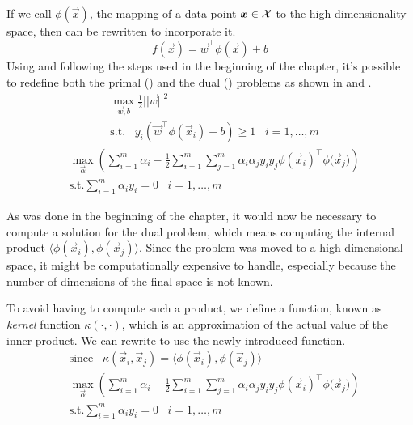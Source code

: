 If we call $\phi(\vec{x})$, the mapping of a data-point $\boldsymbol{x} \in \mathcal{X}$ to the high
dimensionality space, then  can be rewritten to incorporate it.
\begin{equation}
	\label{ep:hd-hyperplane}
	f(\vec{x}) = \vec{w}^\top \phi(\vec{x}) + b
\end{equation}
Using  and following the steps used in the beginning of the chapter,
it's possible to redefine both the primal () and the dual () problems
as shown in  and .
\begin{equation}
	\label{eq:hd-primal}
	\begin{aligned}
		 & \max_{\vec{w}, b}\frac{1}{2}||\vec{w}||^2                                                   \\
		 & \text{s.t.}\hspace{10pt}y_i(\vec{w}^\top\phi(\vec{x}_i) + b) \geq 1 \hspace{10pt}i = 1, \ldots, m
	\end{aligned}
\end{equation}
\begin{equation}
	\label{eq:hd-dual}
	\begin{aligned}
		 & \max_{\vec{\alpha}}\left(\sum_{i = 1}^{m}{\alpha_i} - \frac{1}{2}\sum_{i =
		1}^{m}\sum_{j = 1}^{m}{\alpha_i\alpha_j y_i y_j \phi(\vec{x}_i)^\top\phi(\vec{x}_j})\right)       \\
		 & \text{s.t.} \sum_{i = 1}^{m}{\alpha_i y_i} = 0 \hspace{10pt} i = 1, \ldots, m
	\end{aligned}
\end{equation}

As was done in the beginning of the chapter, it would now be necessary to compute a solution for the
dual problem, which means computing the internal product $\langle\phi(\vec{x}_i),
\phi(\vec{x}_j)\rangle$. Since the problem was moved to a high dimensional space, it might be
computationally expensive to handle, especially because the number of dimensions of the final space
is not known.

To avoid having to compute such a product, we define a function, known as \emph{kernel} function
$\kappa(\cdot, \cdot)$,
which is an approximation of the actual value of the inner product. We can rewrite  to use the newly introduced function.
\begin{equation}
	\label{eq:hd-dual-kf}
	\begin{aligned}
		&\text{since} \hspace{10pt} \kappa(\vec{x}_i, \vec{x}_j) = \langle\phi(\vec{x}_i),
\phi(\vec{x}_j)\rangle \\
		 & \max_{\vec{\alpha}}\left(\sum_{i = 1}^{m}{\alpha_i} - \frac{1}{2}\sum_{i =
		1}^{m}\sum_{j = 1}^{m}{\alpha_i\alpha_j y_i y_j \phi(\vec{x}_i)^\top\phi(\vec{x}_j})\right)       \\
		 & \text{s.t.} \sum_{i = 1}^{m}{\alpha_i y_i} = 0 \hspace{10pt} i = 1, \ldots, m
	\end{aligned}
\end{equation}

